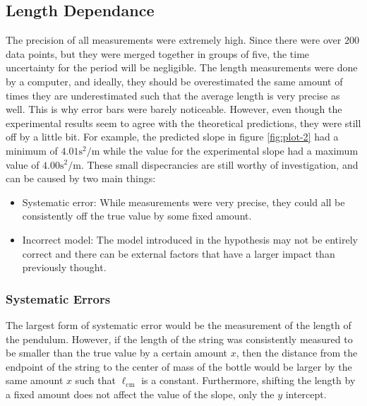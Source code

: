\documentclass[%
 reprint,
 amsmath,amssymb
 aps,
]{revtex4-2}
\begin{document}
\subsection{Length Dependance}
The precision of all measurements were extremely high. Since there were over $200$ data points, but they were merged together in groups of five, the time uncertainty for the period will be negligible. The length measurements were done by a computer, and ideally, they should be overestimated the same amount of times they are underestimated such that the average length is very precise as well. This is why error bars were barely noticeable. However, even though the experimental results seem to agree with the theoretical predictions, they were still off by a little bit. For example, the predicted slope in figure \ref{fig:plot-2} had a minimum of $4.01\si{\second\squared\per\meter}$ while the value for the experimental slope had a maximum value of $4.00\si{\second\squared\per\meter}$. These small dispecrancies are still worthy of investigation, and can be caused by two main things:
\begin{itemize}
    \item Systematic error: While measurements were very precise, they could all be consistently off the true value by some fixed amount.
    \item Incorrect model: The model introduced in the hypothesis may not be entirely correct and there can be external factors that have a larger impact than previously thought.
\end{itemize}
\subsubsection{Systematic Errors}
The largest form of systematic error would be the measurement of the length of the pendulum. However, if the length of the string was consistently measured to be smaller than the true value by a certain amount $x$, then the distance from the endpoint of the string to the center of mass of the bottle would be larger by the same amount $x$ such that $\ell_\text{cm}$ is a constant. Furthermore, shifting the length by a fixed amount does not affect the value of the slope, only the $y$ intercept.
\end{document}
